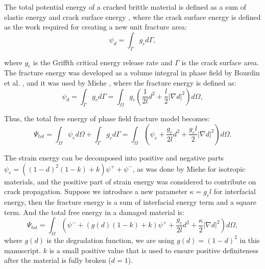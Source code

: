 \documentclass[3p,10pt,sort&compress]{elsarticle}
\begin{document}
The total potential energy of a cracked brittle material is defined as a sum of elastic energy and crack surface energy \cite{borden2012phase}, where the crack surface energy is defined as the work required for creating a new unit fracture area:
\begin{equation}
  \psi_{d} = \int_\Gamma g_c d\Gamma,
\end{equation}


where $g_c$ is the Griffth critical energy release rate and $\Gamma$ is the crack surface area. The fracture energy was developed as a volume integral in phase field by Bourdin et al. \cite{bourdin2008variational}, and it was used by Miehe \cite{miehe2010thermodynamically}, where the fracture energy is defined as:
\begin{equation}
  \psi_{d} =\int_\Gamma g_c d\Gamma = \int_\Omega g_c (\frac{1}{2l}d^2 + \frac{l}{2}{|\nabla d|}^2)d\Omega,
\end{equation}

Thus, the total free energy of phase field fracture model becomes:
\begin{equation}
  {\Psi}_{tot} = \int_\Omega \psi_e d\Omega + \int_\Gamma g_c d\Gamma=\int_\Omega \left( \psi_e  + \frac{g_c}{2l}d^2 + \frac{g_c l}{2} {|\nabla d|}^2\right) d\Omega.
\end{equation}


The strain energy can be decomposed into positive and negative parts $\psi_e = ((1-d)^2(1-k) + k) \psi^+ + \psi^-$, as was done by Miehe \cite{miehe2010thermodynamically} for isotropic materials, and the positive part of strain energy was considered to contribute on crack propagation. Suppose we introduce a new parameter $\kappa=g_c l$ for interfacial energy, then the fracture energy is a sum of interfacial energy term and a square term. And the total free energy in a damaged material is:
\begin{equation}
  {\Psi}_{tot} = \int_\Omega \left( \psi^-  + (g(d)(1-k) + k) \psi^+ + \frac{g_c}{2l}d^2 + \frac{\kappa}{2} {|\nabla d|}^2\right) d\Omega,
\end{equation}
where $g(d)$ is the degradation function, we are using $g(d)=(1-d)^2$ in this manuscript. $k$ is a small positive value that is used to ensure positive definiteness after the material is fully broken ($d=1$).
\end{document}
